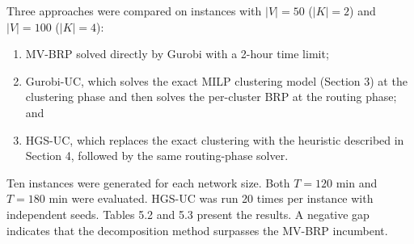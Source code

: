 \documentclass[11pt]{article}
\numberwithin{table}{section}
\numberwithin{figure}{section}
\begin{document}
Three approaches were compared on instances with $\mid V\mid =50$ ($\left| K \right|=2$) and $\mid V\mid =100$ ($\left| K \right|=4$):

\begin{enumerate}[label=(\roman*)]
\item MV-BRP solved directly by Gurobi with a 2-hour time limit;
\item Gurobi-UC, which solves the exact MILP clustering model (Section 3) at the clustering phase and then solves the per-cluster BRP at the routing phase; and
\item HGS-UC, which replaces the exact clustering with the heuristic described in Section 4, followed by the same routing-phase solver.
\end{enumerate}

Ten instances were generated for each network size. Both $T=120$ min and $T=180$ min were evaluated. HGS-UC was run 20 times per instance with independent seeds. Tables 5.2 and 5.3 present the results. A negative gap indicates that the decomposition method surpasses the MV-BRP incumbent.
\end{document}
